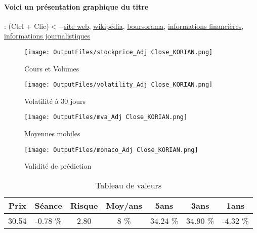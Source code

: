 \documentclass[11pt,a4paper]{report}%
\begin{document}
\paragraph{Voici un présentation graphique du titre} : (Ctrl + Clic)$<-$\href{https://www.korian.com/fr/finance}{site web}, \href{https://fr.wikipedia.org/wiki/Korian}{wikipédia}, \href{https://www.boursorama.com/cours/1rPKORI}{boursorama}, \href{https://www.qwant.com/?q=site:https:%2f%2fwww.easybourse.com%2faction-societe%2fKORIAN&t=web&client=ext-firefox-hp}{informations financières}, \href{https://bourse.lerevenu.com/cours-de-bourse/fiche-valeur-synthese/KORIAN/KORI-FR}{informations journalistiques}
\begin{figure}[!htb]
   \begin{minipage}{0.5\textwidth}
     \centering
     \texttt{[image: OutputFiles/stockprice\_Adj Close\_KORIAN.png]}
     \caption{Cours et Volumes}\label{Fig:price_KORIAN}
   \end{minipage}\hfill
   \begin{minipage}{0.5\textwidth}
     \centering
     \texttt{[image: OutputFiles/volatility\_Adj Close\_KORIAN.png]}
     \caption{Volatilité à 30 jours}\label{Fig:volat_KORIAN}
   \end{minipage}
\end{figure}
\begin{figure}[!htb]
   \begin{minipage}{0.5\textwidth}
     \centering
     \texttt{[image: OutputFiles/mva\_Adj Close\_KORIAN.png]}
     \caption{Moyennes mobiles}\label{Fig:mva_KORIAN}
   \end{minipage}\hfill
   \begin{minipage}{0.5\textwidth}
     \centering
     \texttt{[image: OutputFiles/monaco\_Adj Close\_KORIAN.png]}
     \caption{Validité de prédiction}\label{Fig:prediction_KORIAN}
   \end{minipage}
\end{figure}

\begin{table}[H]
  \centering
    \begin{tabular}{|c|c|c|c|c|c|c|}
    \hline
    Prix & Séance & Risque  & Moy/ans & 5ans & 3ans & 1ans \\
    \hline
    30.54 &    -0.78 \%    & 2.80 & 8 \% & 34.24 \% & 34.90 \% & -4.32 \% \\
    \hline
    \end{tabular}%
        \label{tab:table_KORIAN}%
      \caption{Tableau de valeurs}
\end{table}%
\end{document}
